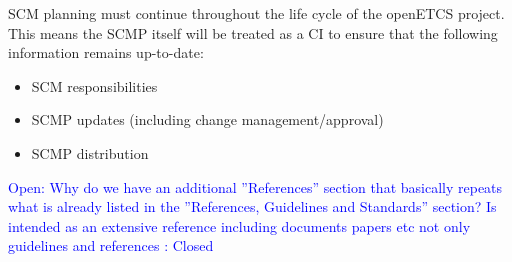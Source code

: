 \documentclass{template/openetcs_report}
\begin{document}
SCM planning must continue throughout the life cycle of the openETCS project. This means the SCMP itself will be treated as a CI to ensure that the following information remains up-to-date:

\vspace{-10pt}
\begin{itemize}
\item SCM responsibilities
\item SCMP updates (including change management/approval)
\item SCMP distribution
\end{itemize}

\newpage
\textcolor{blue}{Open: Why do we have an additional ''References'' section that basically repeats what is already listed in the ''References, Guidelines and Standards'' section? Is intended as an extensive reference including documents papers etc not only guidelines  and references : Closed}

\nocite{*}







\end{document}
